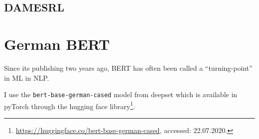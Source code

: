 \subsection{DAMESRL}

\section{German BERT}

Since its publishing two years ago, BERT \citep{devlin2018bert} has often been called a ``turning-point'' in ML in NLP.

I use the \texttt{bert-base-german-cased} model from deepset which is available in pyTorch through the hugging face library\footnote{\url{https://huggingface.co/bert-base-german-cased}, accessed: 22.07.2020.}.

% 
% 
% 
% 
% 
% 
% 
